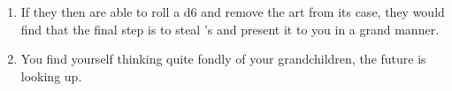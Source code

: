 \documentclass[green]{LRSguildcamp1}
\begin{document}
\begin{enumerate}

\item If they then are able to roll a d6 and remove the art from its case, they would find that the final step is to steal \cOS{}'s \iBagofHolding{} and present it to you in a grand manner. 

\item You find yourself thinking quite fondly of your grandchildren, the future is looking up. 

\end{enumerate}
\end{document}
